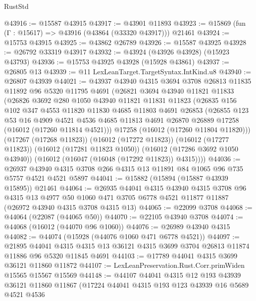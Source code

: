 \begin{lexlean}{RustStd}
\begin{coremodule}
@43916 := @15587 @43915
@43917 := @43901 @11893
@43923 := @15869 (fun (Γ : @15617) => @43916 (@43864 (@33320 @43917))) @21461
@43924 := @15753 @43915
@43925 := @43862 @26789
@43926 := @15587 @43925
@43928 := @26792 @33319 @43917
@43932 := @43924 (@43926 @43928) (@15923 @43793)
@43936 := @15753 @43925 @43928 (@15928 @43861)
@43937 := @26805 @13
@43939 := @11 LexLeanTarget.TargetSyntax.IntKind.u8
@43940 := @26807 @43939
@44021 := @43937
    @43940
    @4315
    @3694
    @3708
    @26813
    @11835
    @11892
    @96
    @5320
    @11795
    @4691
    (@26821
      @3694
      @43940
      @11821
      @11833
      (@26826
        @3692
        @280
        @1050
        @43940
        @11821
        @11831
        @11823
        (@26835
          @156
          @102
          @347
          @4553
          @11820
          @11830
          @4685
          @11803
          @4691
          @26853
          (@26855
            @123
            @53
            @16
            @4909
            @4521
            @4536
            @4685
            @11813
            @4691
            @26870
            @26889
            @17258
            (@16012 (@17260 @11814 @4521)))
          @17258
          (@16012 (@17260 @11804 @11820)))
        (@17267 (@17268 @11823))
        (@16012 (@17272 @11823))
        (@16012 (@17277 @11823))
        (@16012 (@17281 @11823 @1050))
        (@16012 (@17286 @3692 @1050 @43940))
        (@16012 (@16047 (@16048 (@17292 @11823)) @4315))))
@44036 := @26937 @43940 @4315 @3708 @266 @4315 @13 @11891 @84 @1065 @96 @735 @5757 @4521 @4521 @5897
@44041 := @15882 (@15894 (@15887 @43939 @15895)) @21461
@44064 := @26935
    @44041
    @4315
    @43940
    @4315
    @3708
    @96
    @4315
    @13
    @4977
    @50
    @1060
    @471
    @3705
    @6778
    @4521
    @11877
    @11887
    (@26972 @43940 @4315 @3708 @4315 @13)
@44065 := @22099 @3708
@44068 := @44064 (@22087 (@44065 @50))
@44070 := @22105 @43940 @3708
@44074 := @44068 (@16012 (@44070 @96 @1060))
@44076 := @26989 @43940 @4315
@44082 := @44074 (@15928 (@44076 @1060 @471 @6778 @4521))
@44097 := @21895
    @44041
    @4315
    @4315
    @13
    @36121
    @4315
    @3699
    @3704
    @26813
    @11874
    @11886
    @96
    @5320
    @11845
    @4691
@44103 := @17789 @44041 @4315 @3699 @36121 @11860 @11872
@44107 := LexLeanPreservation.Rust.Corr.primWiden @15565 @15567 @15569
@44148 := @44107
    @44041
    @4315
    @12
    @193
    @43939
    @36121
    @11860
    @11867
    (@17224
      @44041
      @4315
      @193
      @123
      @43939
      @16
      @5689
      @4521
      @4536

\end{coremodule}
\end{lexlean}
